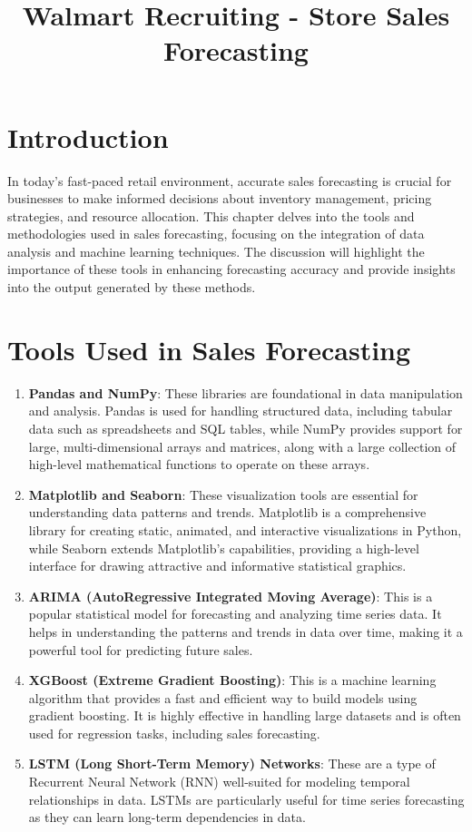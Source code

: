 \documentclass{article}
\title{Walmart Recruiting - Store Sales Forecasting}
\author{}
\date{}
\begin{document}
\maketitle

\section{Introduction}
In today's fast-paced retail environment, accurate sales forecasting is crucial for businesses to make informed decisions about inventory management, pricing strategies, and resource allocation. This chapter delves into the tools and methodologies used in sales forecasting, focusing on the integration of data analysis and machine learning techniques. The discussion will highlight the importance of these tools in enhancing forecasting accuracy and provide insights into the output generated by these methods.

\section{Tools Used in Sales Forecasting}
\begin{enumerate}
    \item \textbf{Pandas and NumPy}: These libraries are foundational in data manipulation and analysis. Pandas is used for handling structured data, including tabular data such as spreadsheets and SQL tables, while NumPy provides support for large, multi-dimensional arrays and matrices, along with a large collection of high-level mathematical functions to operate on these arrays.
    
    \item \textbf{Matplotlib and Seaborn}: These visualization tools are essential for understanding data patterns and trends. Matplotlib is a comprehensive library for creating static, animated, and interactive visualizations in Python, while Seaborn extends Matplotlib's capabilities, providing a high-level interface for drawing attractive and informative statistical graphics.
    
    \item \textbf{ARIMA (AutoRegressive Integrated Moving Average)}: This is a popular statistical model for forecasting and analyzing time series data. It helps in understanding the patterns and trends in data over time, making it a powerful tool for predicting future sales.
    
    \item \textbf{XGBoost (Extreme Gradient Boosting)}: This is a machine learning algorithm that provides a fast and efficient way to build models using gradient boosting. It is highly effective in handling large datasets and is often used for regression tasks, including sales forecasting.
    
    \item \textbf{LSTM (Long Short-Term Memory) Networks}: These are a type of Recurrent Neural Network (RNN) well-suited for modeling temporal relationships in data. LSTMs are particularly useful for time series forecasting as they can learn long-term dependencies in data.
\end{enumerate}
\end{document}
